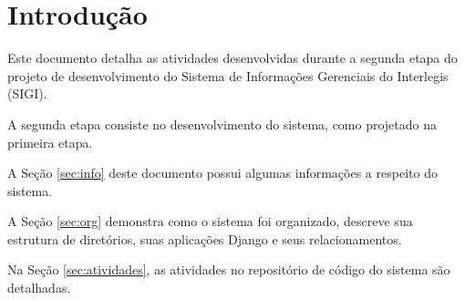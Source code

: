 %
%

\section{Introdução}
Este documento detalha as atividades desenvolvidas durante a segunda
etapa do projeto de desenvolvimento do Sistema de Informações
Gerenciais do Interlegis (SIGI).

A segunda etapa consiste no desenvolvimento do sistema, como projetado
na primeira etapa.

A Seção \ref{sec:info} deste documento possui algumas informações a
respeito do sistema.

A Seção \ref{sec:org} demonstra como o sistema foi organizado,
descreve sua estrutura de diretórios, suas aplicações Django e seus
relacionamentos.

Na Seção \ref{sec:atividades}, as atividades no repositório de código
do sistema são detalhadas.

%
%
